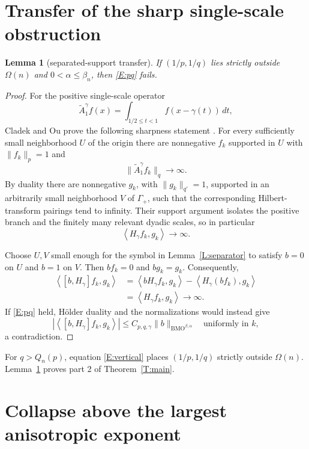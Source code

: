 \documentclass[11pt]{article}
\newtheorem{lemma}[theorem]{Lemma}
\newcommand{\BMO}{\operatorname{BMO}}
\newcommand{\ip}[2]{\left\langle #1,#2\right\rangle}
\begin{document}
\section{Transfer of the sharp single-scale obstruction}

\begin{lemma}[separated-support transfer]\label{L:transfer}
If $(1/p,1/q)$ lies strictly outside $\Omega(n)$ and
$0<\alpha\le\beta_n$, then \eqref{E:pq} fails.
\end{lemma}

\begin{proof}
For the positive single-scale operator
\[
 \widetilde A_1^\gamma f(x)=\int_{1/2\le t<1}
 f(x-\gamma(t))\,dt,
\]
Cladek and Ou prove the following sharpness statement
\cite[Sec.~4.2]{CladekOu}.  For every sufficiently small neighborhood $U$ of
the origin there are nonnegative $f_k$ supported in $U$ with
$\|f_k\|_p=1$ and
\[
                 \|\widetilde A_1^\gamma f_k\|_q\longrightarrow\infty.
\]
By duality there are nonnegative $g_k$, with $\|g_k\|_{q'}=1$, supported in
an arbitrarily small neighborhood $V$ of $\Gamma_+$, such that the
corresponding Hilbert-transform pairings tend to infinity.  Their support
argument isolates the positive branch and the finitely many relevant dyadic
scales, so in particular
\begin{equation}\label{E:CO}
                 \ip{H_\gamma f_k}{g_k}\longrightarrow\infty.
\end{equation}

Choose $U,V$ small enough for the symbol in Lemma~\ref{L:separator} to
satisfy $b=0$ on $U$ and $b=1$ on $V$.  Then $bf_k=0$ and $bg_k=g_k$.
Consequently,
\begin{align*}
 \ip{[b,H_\gamma]f_k}{g_k}
 &=\ip{bH_\gamma f_k}{g_k}-\ip{H_\gamma(bf_k)}{g_k}\\
 &=\ip{H_\gamma f_k}{g_k}\longrightarrow\infty.
\end{align*}
If \eqref{E:pq} held, Hölder duality and the normalizations would instead
give
\[
 |\ip{[b,H_\gamma]f_k}{g_k}|
 \le C_{p,q,\gamma}\|b\|_{\BMO^{\beta,\alpha}}
 \quad\text{uniformly in }k,
\]
a contradiction.
\end{proof}

For $q>Q_n(p)$, equation \eqref{E:vertical} places $(1/p,1/q)$ strictly
outside $\Omega(n)$.  Lemma~\ref{L:transfer} proves part 2 of
Theorem~\ref{T:main}.

\section{Collapse above the largest anisotropic exponent}
\end{document}
